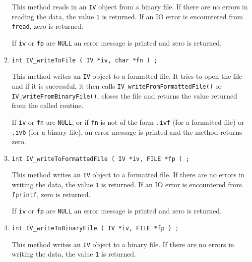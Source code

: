 \begin{enumerate}
\par
This method reads in an {\tt IV} object from a binary file.
If there are no errors in reading the data, 
the value {\tt 1} is returned.
If an IO error is encountered from {\tt fread}, zero is returned.
\par {}
If {\tt iv} or {\tt fp} are {\tt NULL} an error message 
is printed and zero is returned.
\item
\begin{verbatim}
int IV_writeToFile ( IV *iv, char *fn ) ;
\end{verbatim}
\par
This method writes an {\tt IV} object to a formatted file.
It tries to open the file and if it is successful, 
it then calls {\tt IV\_writeFromFormattedFile()} or
{\tt IV\_writeFromBinaryFile()},
closes the file
and returns the value returned from the called routine.
\par {}
If {\tt iv} or {\tt fn} are {\tt NULL}, 
or if {\tt fn} is not of the form
{\tt *.ivf} (for a formatted file) 
or {\tt *.ivb} (for a binary file),
an error message is printed and the method returns zero.
\item
\begin{verbatim}
int IV_writeToFormattedFile ( IV *iv, FILE *fp ) ;
\end{verbatim}
\par
This method writes an {\tt IV} object to a formatted file.
If there are no errors in writing the data, 
the value {\tt 1} is returned.
If an IO error is encountered from {\tt fprintf}, zero is returned.
\par {}
If {\tt iv} or {\tt fp} are {\tt NULL} an error message is printed and
zero is returned.
\item
\begin{verbatim}
int IV_writeToBinaryFile ( IV *iv, FILE *fp ) ;
\end{verbatim}
\par
This method writes an {\tt IV} object to a binary file.
If there are no errors in writing the data, 
the value {\tt 1} is returned.

\end{enumerate}
